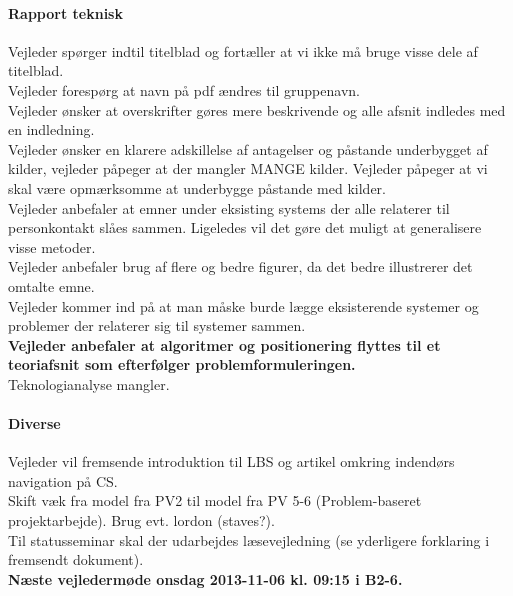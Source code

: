 \documentclass[article,11pt]{memoir}
\begin{document}
\paragraph{Rapport teknisk}
Vejleder spørger indtil titelblad og fortæller at vi ikke må bruge visse dele af titelblad. \\
Vejleder forespørg at navn på pdf ændres til gruppenavn.\\
Vejleder ønsker at overskrifter gøres mere beskrivende og alle afsnit indledes med en indledning.\\
Vejleder ønsker en klarere adskillelse af antagelser og påstande underbygget af kilder, vejleder påpeger at der mangler MANGE kilder. Vejleder påpeger at vi skal være opmærksomme at underbygge påstande med kilder.\\
Vejleder anbefaler at emner under eksisting systems der alle relaterer til personkontakt slåes sammen. Ligeledes vil det gøre det muligt at generalisere visse metoder.\\
Vejleder anbefaler brug af flere og bedre figurer, da det bedre illustrerer det omtalte emne.\\
Vejleder kommer ind på at man måske burde lægge eksisterende systemer og problemer der relaterer sig til systemer sammen.\\
\textbf{Vejleder anbefaler at algoritmer og positionering flyttes til et teoriafsnit som efterfølger problemformuleringen.}\\
Teknologianalyse mangler.\\

\paragraph{Diverse}
Vejleder vil fremsende introduktion til LBS og artikel omkring indendørs navigation på CS.\\
Skift væk fra model fra PV2 til model fra PV 5-6 (Problem-baseret projektarbejde). Brug evt. lordon (staves?).\\
Til statusseminar skal der udarbejdes læsevejledning (se yderligere forklaring i fremsendt dokument).\\

\textbf{Næste vejledermøde onsdag 2013-11-06 kl. 09:15 i B2-6.}
\end{document}
